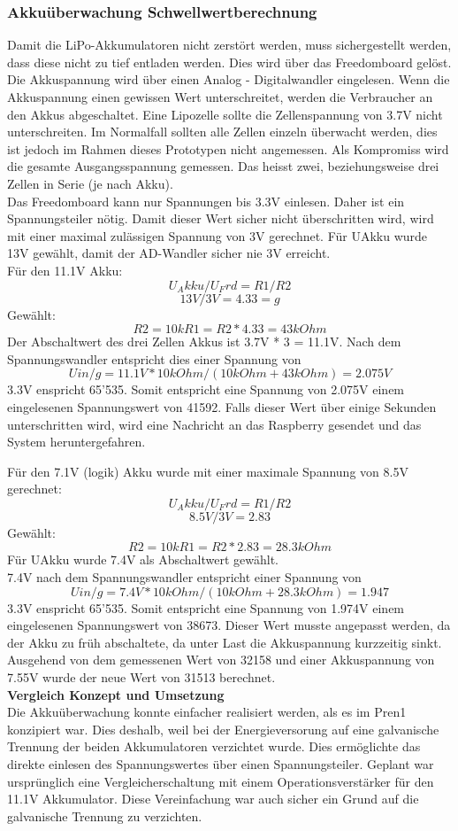\subsubsection{Akkuüberwachung Schwellwertberechnung}
Damit die LiPo-Akkumulatoren nicht zerstört werden, muss sichergestellt werden, dass diese nicht zu tief entladen werden. Dies wird über das Freedomboard gelöst. Die Akkuspannung wird über einen Analog - Digitalwandler eingelesen. Wenn die Akkuspannung einen gewissen Wert unterschreitet, werden die Verbraucher an den Akkus abgeschaltet. Eine Lipozelle sollte die Zellenspannung von 3.7V nicht unterschreiten. Im Normalfall sollten alle Zellen einzeln überwacht werden, dies ist jedoch im Rahmen dieses Prototypen nicht angemessen. Als Kompromiss wird die gesamte Ausgangsspannung gemessen. Das heisst zwei, beziehungsweise drei Zellen in Serie (je nach Akku).\\
Das Freedomboard kann nur Spannungen bis 3.3V einlesen. Daher ist ein Spannungsteiler nötig. Damit dieser Wert sicher nicht überschritten wird, wird mit einer maximal zulässigen Spannung von 3V gerechnet. Für UAkku wurde 13V gewählt, damit der AD-Wandler sicher nie 3V erreicht.\\
Für den 11.1V Akku:
\[	U_Akku/U_Frd=R1/R2\]
\[	13V/3V=4.33=g\]
Gewählt:
\[	R2=10k R1=R2*4.33=43kOhm\]
Der Abschaltwert des drei Zellen Akkus ist 3.7V * 3 = 11.1V.
Nach dem Spannungswandler entspricht dies einer Spannung von \[Uin/g=11.1V*10kOhm/(10kOhm+43kOhm)=2.075V\]
3.3V enspricht 65'535. Somit entspricht eine Spannung von 2.075V einem eingelesenen Spannungswert von 41592. Falls dieser Wert über einige Sekunden unterschritten wird, wird eine Nachricht an das Raspberry gesendet und das System heruntergefahren.

Für den 7.1V (logik) Akku wurde mit einer maximale Spannung von 8.5V gerechnet:
\[	U_Akku/U_Frd=R1/R2\]
\[	8.5V/3V=2.83\]
Gewählt:
\[	R2=10k R1=R2*2.83=28.3kOhm\]
Für UAkku wurde 7.4V als Abschaltwert gewählt.\\
7.4V nach dem Spannungswandler entspricht einer Spannung von \[Uin/g=7.4V*10kOhm/(10kOhm + 28.3kOhm)=1.947\]
3.3V enspricht 65'535. Somit entspricht eine Spannung von 1.974V einem eingelesenen Spannungswert von 38673. Dieser Wert musste angepasst werden, da der Akku zu früh abschaltete, da unter Last die Akkuspannung kurzzeitig sinkt. Ausgehend von dem gemessenen Wert von 32158 und einer Akkuspannung von 7.55V wurde der neue Wert von 31513 berechnet.
\\[0.2cm]
\textbf{Vergleich Konzept und Umsetzung}\\[0.2cm]
Die Akkuüberwachung konnte einfacher realisiert werden, als es im Pren1 konzipiert war. Dies deshalb, weil bei der Energieversorung auf eine galvanische Trennung der beiden Akkumulatoren verzichtet wurde. Dies ermöglichte das direkte einlesen des Spannungswertes über einen Spannungsteiler. Geplant war ursprünglich eine Vergleicherschaltung mit einem Operationsverstärker für den 11.1V Akkumulator. Diese Vereinfachung war auch sicher ein Grund auf die galvanische Trennung zu verzichten.
